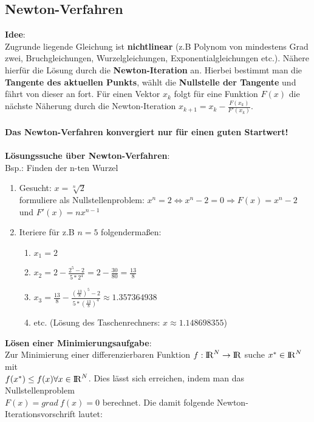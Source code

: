 \documentclass[10pt,a4paper]{article}
\def\realnumbers{{\rm I\!R}}
\begin{document}
	\subsection{Newton-Verfahren}
	\textbf{Idee}:\\Zugrunde liegende Gleichung ist \textbf{nichtlinear} (z.B Polynom von mindestens Grad zwei, Bruchgleichungen, Wurzelgleichungen, Exponentialgleichungen etc.). Nähere hierfür die Lösung durch die \textbf{Newton-Iteration} an. Hierbei bestimmt man die \textbf{Tangente des aktuellen Punkts}, wählt die \textbf{Nullstelle der Tangente} und fährt von dieser an fort. Für einen Vektor $x_k$ folgt für eine Funktion $F(x)$ die nächste Näherung durch die Newton-Iteration $x_{k + 1} = x_k - \frac{F(x_k)}{F'(x_k)}$.\\\\
	\textbf{Das Newton-Verfahren konvergiert nur für einen guten Startwert!}\\\\
	\textbf{Lösungssuche über Newton-Verfahren}:\\
	Bsp.: Finden der n-ten Wurzel
	\begin{enumerate}
		\item Gesucht: $x = \sqrt[n]{2}$\\formuliere als Nullstellenproblem: $x^n = 2 \Leftrightarrow x^n - 2 = 0 \Rightarrow F(x) = x^n - 2$ und $F'(x) = nx^{n - 1}$
		\item Iteriere für z.B $n = 5$ folgendermaßen:
		\begin{enumerate}
			\item $x_1 = 2$
			\item $x_2 = 2 - \frac{2^5 - 2}{5 * 2^4} = 2 - \frac{30}{80} = \frac{13}{8}$
			\item $x_3 = \frac{13}{8} - \frac{(\frac{13}{8})^5 - 2}{5 * (\frac{13}{8})^4} \approx 1.357364938$
			\item etc. (Lösung des Taschenrechners: $x \approx 1.148698355$)
		\end{enumerate}
	\end{enumerate}
	\textbf{Lösen einer Minimierungsaufgabe}:                                                                                        \\
	Zur Minimierung einer differenzierbaren Funktion $f: \realnumbers^N \rightarrow \realnumbers$ suche $x^* \in \realnumbers^N$ mit \\$f(x^*) \leq f(x) \forall x \in \realnumbers^N$. Dies lässt sich erreichen, indem man das Nullstellenproblem\\$F(x) = grad\ f(x) = 0$ berechnet. Die damit folgende Newton-Iterationsvorschrift lautet:
\end{document}
